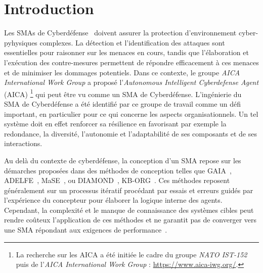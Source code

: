 \documentclass[contribution]{jfsma}
\begin{document}

\section{Introduction}


Les SMAs de Cyberdéfense~\cite{Kott2023, Singh2015} doivent assurer la protection d'environnement cyber-pyhysiques complexes.  La détection et l'identification des attaques sont essentielles pour raisonner sur les menaces en cours, tandis que l'élaboration et l'exécution des contre-mesures permettent de répondre efficacement à ces menaces et de minimiser les dommages potentiels. Dans ce contexte, le groupe \emph{AICA International Work Group} a proposé l'\emph{Autonomous Intelligent Cyberdefense Agent} (AICA)
\footnote{La recherche sur les AICA a été initiée le cadre du groupe \emph{NATO IST-152} puis de l'\emph{AICA International Work Group} : \url{https://www.aica-iwg.org/}. }
qui peut être vu comme un SMA de Cyberdéfense. L'ingénierie du SMA de Cyberdéfense a été identifié par ce groupe de travail comme un défi important, en particulier pour ce qui concerne les aspects organisationnels. %
Un tel système doit en effet renforcer sa résilience en favorisant par exemple la redondance, la diversité, l'autonomie et l'adaptabilité de ses composants et de ses interactions.


Au delà du contexte de cyberdéfense, la conception d'un SMA repose sur les démarches proposées dans des méthodes de conception telles que GAIA~\cite{Wooldridge2000,Cernuzzi2014}, ADELFE~\cite{Mefteh2015}, MaSE~\cite{Deloach2001}, ou DIAMOND~\cite{Jamont2015}, KB-ORG~\cite{Sims2008}.
Ces méthodes reposent généralement sur un processus itératif procédant par essais et erreurs guidés par l'expérience du concepteur pour élaborer la logique interne des agents. Cependant, la complexité et le manque de connaissance des systèmes cibles peut rendre coûteux l'application de ces méthodes et ne garantit pas de converger vers une SMA répondant aux exigences de performance~\cite{Mefteh2013}.
\end{document}

